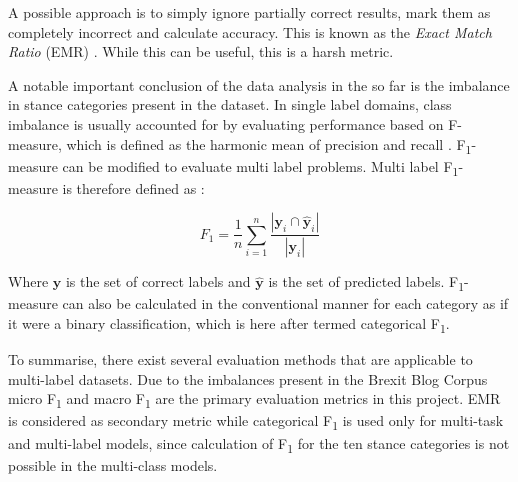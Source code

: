\documentclass[Dissertation.tex]{subfiles}
\begin{document}
A possible approach is to simply ignore partially correct results, mark them as completely incorrect and calculate accuracy. This is known as the \textit{Exact Match Ratio} (EMR) \cite{sorowerLiteratureSurveyAlgorithms2018}. While this can be useful, this is a harsh metric.

A notable important conclusion of the data analysis in the so far is the imbalance in stance categories present in the dataset. In single label domains, class imbalance is usually accounted for by evaluating performance based on F-measure, which is defined as the harmonic mean of precision and recall \cite{sorowerLiteratureSurveyAlgorithms2018}. F\textsubscript{1}-measure can be modified to evaluate multi label problems. Multi label F\textsubscript{1}-measure is therefore defined as \cite{sorowerLiteratureSurveyAlgorithms2018}:

\[ F_1 = \frac{1}{n}\sum_{i=1}^{n}\frac{|\mathbf{y}_i \cap \mathbf{\hat{y}}_i|}{|\mathbf{y}_i|}\] 

Where $ \mathbf{y} $ is the set of correct labels and $ \mathbf{\hat{y}} $ is the set of predicted labels. F\textsubscript{1}-measure can also be calculated in the conventional manner for each category as if it were a binary classification, which is here after termed categorical F\textsubscript{1}.


To summarise, there exist several evaluation methods that are applicable to multi-label datasets. Due to the imbalances present in the Brexit Blog Corpus micro F\textsubscript{1} and macro F\textsubscript{1} are the primary evaluation metrics in this project. EMR is considered as secondary metric while categorical F\textsubscript{1} is used only for multi-task and multi-label models, since calculation of F\textsubscript{1} for the ten stance categories is not possible in the multi-class models. 
\end{document}

